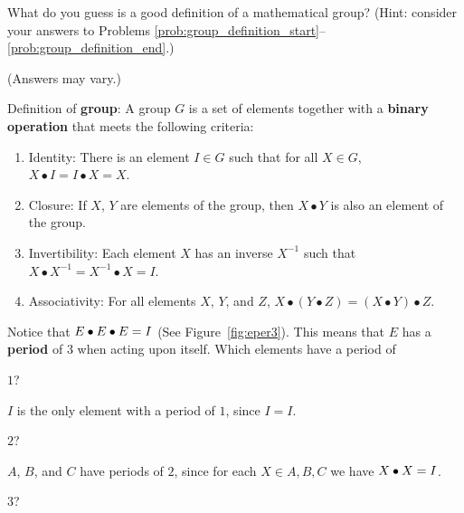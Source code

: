 \documentclass[../gatm_answers.tex]{subfiles}
\begin{document}
\begin{outer_problem}
\item What do you guess is a good definition of a mathematical group? (Hint: consider your answers to Problems \ref{prob:group_definition_start}--\ref{prob:group_definition_end}.)
\end{outer_problem}

\noindent (Answers may vary.)

Definition of \textbf{group}: A group $G$ is a set of elements together with a \textbf{binary operation} that meets the following criteria:
\begin{enumerate}[label=(\alph*)]
\item Identity: There is an element $I\in G$ such that for all $X\in G$, $X\bullet I = I\bullet X = X$.
\item Closure: If $X$, $Y$ are elements of the group, then $X\bullet Y$ is also an element of the group.
\item Invertibility: Each element $X$ has an inverse $X^{-1}$ such that $X\bullet X^{-1} = X^{-1}\bullet X = I$.
\item Associativity: For all elements $X$, $Y$, and $Z$, $X\bullet (Y\bullet Z) = (X\bullet Y) \bullet Z$.
\end{enumerate}

\begin{outer_problem}
\item Notice that $E\bullet E\bullet E=I$ (See Figure~\ref{fig:eper3}). This means that $E$ has a \textbf{period} of $3$ when acting upon itself. Which elements have a period of
\end{outer_problem}

\begin{inner_problem}[start=1]
	 \item $1$?
\end{inner_problem}

\noindent $I$ is the only element with a period of $1$, since $I=I$.

\begin{inner_problem}
	 \item $2$?
\end{inner_problem}

\noindent $A$, $B$, and $C$ have periods of $2$, since for each $X\in{A,B,C}$ we have $X\bullet X = I$.

\begin{inner_problem}
	 \item $3$?
\end{inner_problem}
\end{document}
